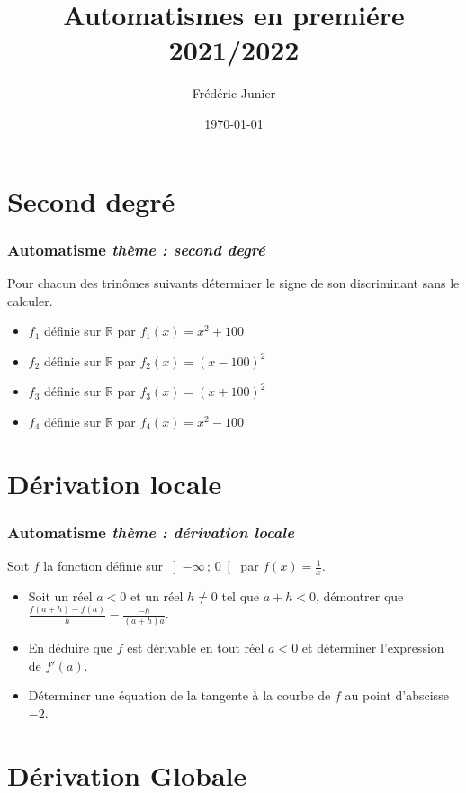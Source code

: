 \documentclass[11pt]{beamer}
\title[automatismes]{Automatismes en premi\'ere 2021/2022}
\author[F.Junier]{Fr\'ed\'eric Junier}
\institute[Le Parc]{{\centering Lyc\'ee du Parc \\
1 Boulevard Anatole France \\ 69006 Lyon }}
\date[\today]{\today}
\newcommand{\R}{\mathbb{R}}
\newcommand{\Interoo}[2]{\left]#1\, ;\, #2\right[}
\newcounter{autocompteur}
\newcommand{\automatisme}[1]{\addtocounter{autocompteur}{1}\frametitle{Automatisme  \theautocompteur  \textit{ thème : #1}}}
\begin{document}
\frame{\titlepage}

\section{Second degré}


\begin{frame}
\automatisme{second degré}

Pour chacun des trinômes suivants déterminer le signe de son discriminant sans le calculer.
\begin{itemize}
\item $f_{1}$ définie sur $\R$ par $f_{1}(x)=x^2+100$
\item $f_{2}$ définie sur $\R$ par $f_{2}(x)=(x-100)^2$
\item $f_{3}$ définie sur $\R$ par $f_{3}(x)=(x+100)^2$
\item $f_{4}$ définie sur $\R$ par $f_{4}(x)=x^2-100$
\end{itemize}

\end{frame}



\section{Dérivation locale}

\label{derivationglocale}


\begin{frame}
\automatisme{dérivation locale}

Soit $f$ la fonction définie sur $\Interoo{-\infty}{0}$ par  $f(x)=\frac{1}{x}$.
\begin{itemize}
\item Soit un réel $a<0$ et un réel $h \neq 0$ tel que $a+h<0$, démontrer que $\frac{f(a+h)-f(a)}{h}=\frac{-h}{(a+h)a}$.
\item En déduire que $f$ est dérivable en tout réel $a<0$ et déterminer l'expression de $f'(a)$.
\item Déterminer une équation de la tangente à la courbe de $f$ au point d'abscisse $-2$.
\end{itemize}

\end{frame}


\section{Dérivation Globale}

\label{derivationglobale}
\end{document}
